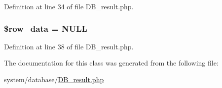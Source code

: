 Definition at line 34 of file D\-B\-\_\-result.\-php.

\hypertarget{class_c_i___d_b__result_a335b4c27a1529df9e484e044e470ec07}{
\subsubsection[{\$row\-\_\-data}]{\setlength{\rightskip}{0pt plus 5cm}\$row\-\_\-data = N\-U\-L\-L}}\label{class_c_i___d_b__result_a335b4c27a1529df9e484e044e470ec07}


Definition at line 38 of file D\-B\-\_\-result.\-php.



The documentation for this class was generated from the following file\-:\begin{DoxyCompactItemize}
\item 
system/database/\hyperlink{_d_b__result_8php}{D\-B\-\_\-result.\-php}\end{DoxyCompactItemize}

